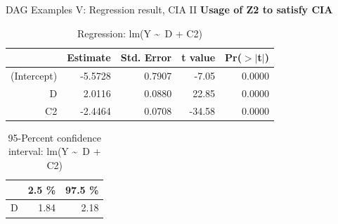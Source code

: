 \documentclass{beamer}\usepackage[]{graphicx}\usepackage[]{color}
\begin{document}
\begin{frame}[fragile]{DAG Examples V: Regression result, CIA II}
\textbf{Usage of Z2 to satisfy CIA}
\begin{table}[ht]
\centering
\begingroup\small
\begin{tabular}{rrrrr}
  \hline
 & Estimate & Std. Error & t value & Pr($>$$|$t$|$) \\ 
  \hline
(Intercept) & -5.5728 & 0.7907 & -7.05 & 0.0000 \\ 
  D & 2.0116 & 0.0880 & 22.85 & 0.0000 \\ 
  C2 & -2.4464 & 0.0708 & -34.58 & 0.0000 \\ 
   \hline
\end{tabular}
\endgroup
\caption{Regression: lm(Y \textasciitilde ~D + C2)} 
\end{table}
\begin{table}[ht]
\centering
\begingroup\small
\begin{tabular}{rrr}
  \hline
 & 2.5 \% & 97.5 \% \\ 
  \hline
D & 1.84 & 2.18 \\ 
   \hline
\end{tabular}
\endgroup
\caption{95-Percent confidence interval: lm(Y \textasciitilde ~D + C2)} 
\end{table}

\end{frame}
\end{document}
